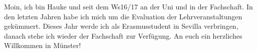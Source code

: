 \begin{multicols*}{2}
{Moin, ich bin Hauke und seit dem Ws16/17 an der Uni und in der Fachschaft.
In den letzten Jahren habe ich mich um die Evaluation der Lehrveranstaltungen gekümmert. Dieses Jahr werde ich als Erasmusstudent in Sevilla verbringen, danach stehe ich wieder der Fachschaft zur Verfügung. An euch ein herzliches Willkommen in Münster! 
	\vspace{2\baselineskip}
}


\end{multicols*}

